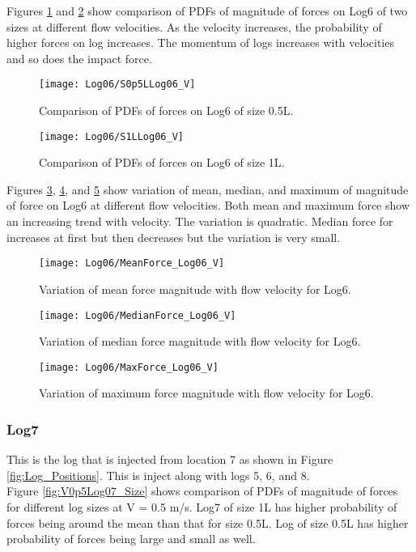 \noindent Figures \ref{fig:S0p5LLog06_V} and \ref{fig:S1LLog06_V} show comparison of PDFs of magnitude of forces on Log6 of two sizes at different flow velocities. As the velocity increases, the probability of higher forces on log increases. The momentum of logs increases with velocities and so does the impact force.

\begin{figure}
\centering
\texttt{[image: Log06/S0p5LLog06\_V]}
\caption{\label{fig:S0p5LLog06_V}Comparison of PDFs of forces on Log6 of size 0.5L.}
\end{figure}
\begin{figure}
\centering
\texttt{[image: Log06/S1LLog06\_V]}
\caption{\label{fig:S1LLog06_V}Comparison of PDFs of forces on Log6 of size 1L.}
\end{figure}

\noindent Figures \ref{fig:MeanForce_Log06_V}, \ref{fig:MedianForce_Log06_V}, and \ref{fig:MaxForce_Log06_V} show variation of mean, median, and maximum of magnitude of force on Log6 at different flow velocities. Both mean and maximum force show an increasing trend with velocity. The variation is quadratic. Median force for increases at first but then decreases but the variation is very small. 

\begin{figure}
\centering
\texttt{[image: Log06/MeanForce\_Log06\_V]}
\caption{\label{fig:MeanForce_Log06_V}Variation of mean force magnitude with flow velocity for Log6.}
\end{figure}
\begin{figure}
\centering
\texttt{[image: Log06/MedianForce\_Log06\_V]}
\caption{\label{fig:MedianForce_Log06_V}Variation of median force magnitude with flow velocity for Log6.}
\end{figure}
\begin{figure}
\centering
\texttt{[image: Log06/MaxForce\_Log06\_V]}
\caption{\label{fig:MaxForce_Log06_V}Variation of maximum force magnitude with flow velocity for Log6.}
\end{figure}

\FloatBarrier
\subsubsection{Log7}
This is the log that is injected from location 7 as shown in Figure \ref{fig:Log_Positions}. This is inject along with logs 5, 6, and 8.\\ 
Figure \ref{fig:V0p5Log07_Size} shows comparison of PDFs of magnitude of forces for different log sizes at V = 0.5 m/s. Log7 of size 1L has higher probability of forces being around the mean than that for size 0.5L. Log of size 0.5L has higher probability of forces being large and small as well.


